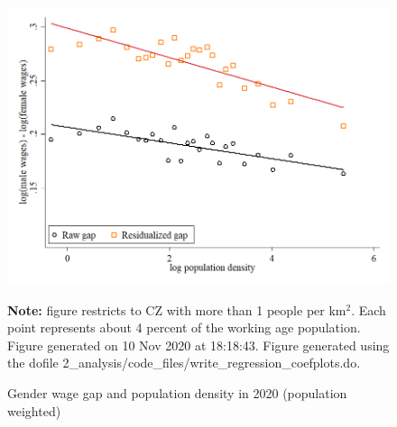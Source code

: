 \begin{figure}[!h]
\centering
\caption{Gender wage gap and population density in 2020 (population weighted)}
\includegraphics[width=1\textwidth]{../2_analysis/output/figures/l_czone_density_2020_hum}
\par \begin{minipage}[h]{\textwidth}{\tiny\textbf{Note:} figure restricts to CZ with more than 1 people per km$^2$. Each point represents about 4 percent of the working age population. Figure generated on 10 Nov 2020 at 18:18:43. Figure generated using the dofile 2\_analysis/code\_files/write\_regression\_coefplots.do.}\end{minipage}
\end{figure}
